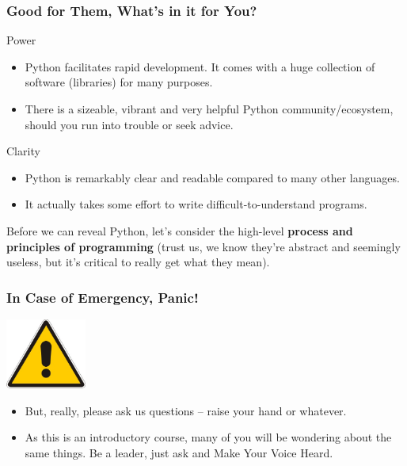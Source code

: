 \documentclass[10pt]{beamer}
\begin{document}
\begin{frame}
  \frametitle{Good for Them, What's in it for You?}
  \begin{block}{Power}
    \begin{itemize}
      \item Python facilitates rapid development.
        It comes with a huge collection of software (libraries) for many purposes.
      \item There is a sizeable, vibrant and very helpful Python community/ecosystem, should you run into trouble or seek advice.
    \end{itemize}
  \end{block}
  \begin{block}{Clarity}
    \begin{itemize}
      \item Python is remarkably clear and readable compared to many other languages.
      \item It actually takes some effort to write difficult-to-understand programs.
    \end{itemize}
  \end{block}
  Before we can reveal Python, let's consider the high-level \textbf{process and principles of programming} (trust us, we know they're abstract and seemingly useless, but it's critical to really get what they mean).
\end{frame}

\begin{frame}
  \frametitle{In Case of Emergency, Panic!}
  \begin{center}
    \includegraphics[width=100px]{AlertSign.jpg}
  \end{center}
  \begin{itemize}
    \item But, really, please ask us questions -- raise your hand or whatever.
    \item As this is an introductory course, many of you will be wondering about the same things.
      Be a leader, just ask and Make Your Voice Heard.
  \end{itemize}
\end{frame}
\end{document}

